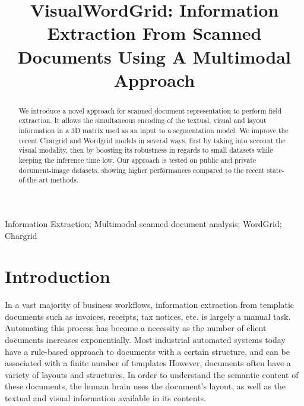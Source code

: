 \documentclass[conference]{IEEEtran}
\begin{document}
\title{VisualWordGrid: Information Extraction From Scanned Documents Using A Multimodal Approach\\
}
\author{
}


\maketitle

\begin{abstract}
We introduce a novel approach for scanned document representation to perform field extraction. 
It allows the simultaneous encoding of the textual, visual and layout information in a 3D matrix used as an input to a segmentation model. We improve the recent Chargrid and Wordgrid \cite{chargrid} models in  several ways, first by taking into account the visual modality, then by boosting its robustness in regards to small datasets while keeping the inference time low.
Our approach is tested on public and private document-image datasets, showing higher performances compared to the recent state-of-the-art methods.

\end{abstract}

\begin{IEEEkeywords}
Information Extraction; Multimodal scanned document analysis; WordGrid; Chargrid

\end{IEEEkeywords}


\IEEEpeerreviewmaketitle



\section{Introduction}
In a vast majority of business workflows, information extraction from templatic documents such as invoices, receipts, tax notices, etc. is largely a manual task. 
Automating this process has become a necessity as the number of client documents increases exponentially.
Most industrial automated systems today have a rule-based approach to documents with a certain structure, and can be associated with a finite number of templates
However, documents often have  a variety of layouts and structures. In order to understand the semantic content of these documents, the human brain uses the document's layout, as well as the textual and visual information available in its contents.
\end{document}
